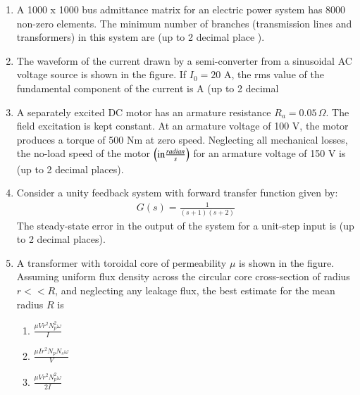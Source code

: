\documentclass[journal]{IEEEtran}
\begin{document}
\begin{enumerate}
\item A 1000 x 1000 bus admittance matrix for an electric power system has 8000 non-zero elements. The minimum number of branches (transmission lines and transformers) in this system are  \underline{\hspace{1cm}} (up to 2 decimal place ).
\item The waveform of the current drawn by a semi-converter from a sinusoidal AC voltage source is shown in the figure. If $I_0 = 20$ A, the rms value of the fundamental component of the current is \underline{\hspace{1cm}} A (up to 2 decimal
    \begin{figure}[!ht]
    \centering
    \label{fig:power system network}
    \end{figure}
\item A separately excited DC motor has an armature resistance $R_a = 0.05 \, \Omega$. The field excitation is kept constant. At an armature voltage of 100 V, the motor produces a torque of 500 Nm at zero speed. Neglecting all mechanical losses, the no-load speed of the motor $\left(\text{in} \frac{radian}{s}\right)$ for an armature voltage of 150 V is \underline{\hspace{1cm}} (up to 2 decimal places).
\item Consider a unity feedback system with forward transfer function given by:
\begin{align}
G(s) = \frac{1}{(s+1)(s+2)}
\end{align}
The steady-state error in the output of the system for a unit-step input is \underline{\hspace{1cm}} (up to 2 decimal places).
\item A transformer with toroidal core of permeability $\mu$ is shown in the figure. Assuming uniform flux density across the circular core cross-section of radius $r << R$, and neglecting any leakage flux, the best estimate for the mean radius $R$ is
\begin{figure}[!ht]
    \centering
    \label{fig:power system network}
    \end{figure}
\begin{enumerate}
    \item $\frac{\mu V r^2 N_p^2 \omega}{I}$
    \item $\frac{\mu I r^2 N_p N_s \omega}{V}$
    \item $\frac{\mu V r^2 N_p^2 \omega}{2I}$

\end{enumerate}
\end{enumerate}
\end{document}
